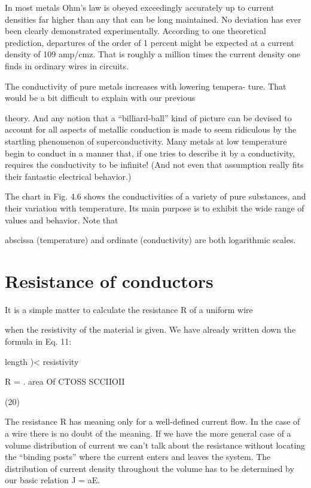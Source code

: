In most metals Ohm's law is obeyed exceedingly accurately up to
current densities far higher than any that can be long maintained.
No deviation has ever been clearly demonstrated experimentally.
According to one theoretical prediction, departures of the order of
1 percent might be expected at a current density of 109 amp/cmz.
That is roughly a million times the current density one finds in
ordinary wires in circuits.

The conductivity of pure metals increases with lowering tempera-
ture. That would be a bit difficult to explain with our previous

theory. And any notion that a ``billiard-ball'' kind of picture can be
devised to account for all aspects of metallic conduction is made to
seem ridiculous by the startling phenomenon of superconductivity.
Many metals at low temperature begin to conduct in a manner that,
if one tries to describe it by a conductivity, requires the conductivity
to be infinite! (And not even that assumption really fits their fantastic
electrical behavior.)

The chart in Fig. 4.6 shows the conductivities of a variety of pure
substances, and their variation with temperature. Its main purpose
is to exhibit the wide range of values and behavior. Note that

abscissa (temperature) and ordinate (conductivity) are both logarithmic
scales.

\section{Resistance of conductors}

It is a simple matter to calculate the resistance R of a uniform wire

when the resistivity of the material is given. We have already written
down the formula in Eq. 11:

length )< resistivity

R = .
area Of CTOSS SCCIIOII

(20)
\begin{equation}
\end{equation}

The resistance R has meaning only for a well-defined current flow.
In the case of a wire there is no doubt of the meaning. If we have the
more general case of a volume distribution of current we can't talk
about the resistance without locating the ``binding posts'' where the
current enters and leaves the system. The distribution of current
density throughout the volume has to be determined by our basic
relation J = aE.


